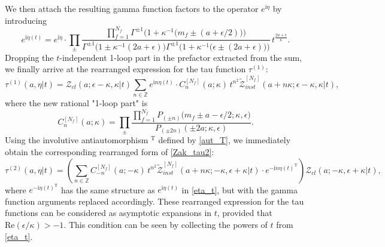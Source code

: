 \documentclass[12pt,a4paper]{article}
\numberwithin{equation}{section}
\newcommand{\ri}{\mathrm{i}}
\begin{document}
We then attach the resulting gamma function factors to the operator $e^{\ri\eta}$ by introducing
\begin{equation}\label{eta_t}
e^{\ri\eta(t)}=e^{\ri\eta}\cdot\prod_{\pm}\frac{\prod\limits_{f=1}^{N_f}\Gamma^{\pm1}\Big(1+\kappa^{-1}\big(m_f\pm(a{+}\epsilon/2)\big)\Big)}{\Gamma^{\pm1}\Big(1\pm\kappa^{-1}(2a{+}\epsilon)\Big) \Gamma^{\pm1}\Big(1+\kappa^{-1}\big(\epsilon\pm(2a{+}\epsilon)\big)\Big)}\,t^{\frac{2a{+}\epsilon}{\kappa}}.
\end{equation}
Dropping the $t$-independent 1-loop part in the prefactor extracted from the sum, we finally arrive at the rearranged expression for the tau function $\tau^{(1)}$:
\begin{equation}\label{Zak_tau1_rearr}
\tau^{(1)}(a,\eta|t)=\mathcal{Z}_{cl}(a;\epsilon{-}\kappa,\kappa|t)  \sum_{n\in\mathbb{Z}}e^{\ri n\eta(t)}\cdot
C_n^{[N_f]}(a;\kappa)\, t^{n^2}\widetilde{\mathcal{Z}}^{[N_f]}_{inst}(a{+}n\kappa;\epsilon{-}\kappa,\kappa|t),
\end{equation}
where the new rational "1-loop part" is
\begin{equation}\label{C_n_weak}
C_n^{[N_f]}(a;\kappa)=\prod_{\pm}\frac{\prod\limits_{f=1}^{N_f}P_{(\pm n)}\big(m_f\pm a-\epsilon/2;\kappa,\epsilon\big)}{P_{(\pm2n)}(\pm2a;\kappa,\epsilon)}.    
\end{equation}
Using the involutive antiautomorphism $^\mathrm{T}$ defined by \eqref{aut_T}, we immediately obtain the corresponding rearranged form of \eqref{Zak_tau2}:
\begin{equation}\label{Zak_tau2_rearr}
\tau^{(2)}(a,\eta|t)=  \left(\sum_{n\in\mathbb{Z}}
C_{-n}^{[N_f]}(a;-\kappa)\,t^{n^2}\widetilde{\mathcal{Z}}^{[N_f]}_{inst}(a{+}n\kappa;-\kappa,\epsilon{+}\kappa|t)\cdot e^{-\ri n\eta(t)^\mathrm{T}} \right) \mathcal{Z}_{cl}(a;-\kappa,\epsilon{+}\kappa|t),
\end{equation}
where
$e^{-\ri \eta(t)^\mathrm{T}}$ has the same structure as $e^{\ri\eta(t)}$ in \eqref{eta_t}, but with the gamma function arguments replaced accordingly.
These rearranged expression for the tau functions
can be considered as asymptotic expansions in $t$, 
provided that $\mathrm{Re}(\epsilon/\kappa)>-1$. This condition can be seen by collecting the powers of $t$ from \eqref{eta_t}.
\end{document}
